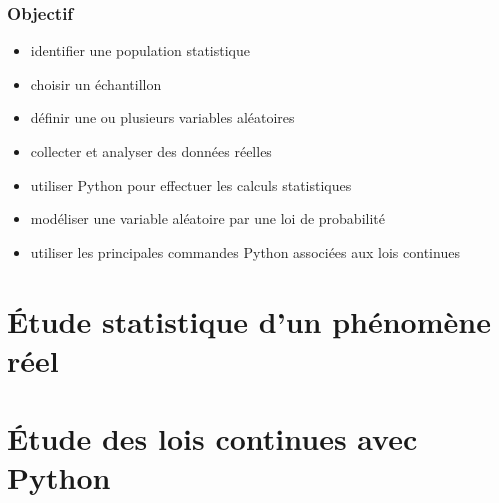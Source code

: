 \documentclass[11pt, a4paper]{article}
\begin{document}
	
	\tpage
	\renewcommand{\author}{Thibauld, Benjamin, Amritesh}
	\tableofcontents\newpage
	\section*{Objectif}
	\begin{itemize}[label=$\Diamond$]
		\item identifier une population statistique
		\item choisir un échantillon
		\item définir une ou plusieurs variables aléatoires
		\item collecter et analyser des données réelles 
		\item utiliser Python pour effectuer les calculs statistiques 
		\item modéliser une variable aléatoire par une loi de probabilité 
		\item utiliser les principales commandes Python associées aux lois continues
	\end{itemize}
	\newpage
	\part{Étude statistique d’un phénomène réel}
	
	\newpage
	\part{Étude des lois continues avec Python}
	\setcounter{section}{0}
	
	
	\epage
	
\end{document}
